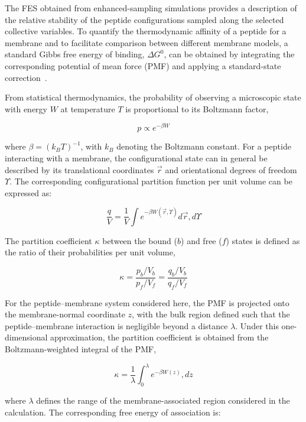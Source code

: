 The FES obtained from enhanced-sampling simulations provides a description of the relative stability of the peptide configurations sampled along the selected collective variables. To quantify the thermodynamic affinity of a peptide for a membrane and to facilitate comparison between different membrane models, a standard Gibbs free energy of binding, $\Delta G^0$, can be obtained by integrating the corresponding potential of mean force (PMF) and applying a standard-state correction~\cite{Woo2005}.

From statistical thermodynamics, the probability of observing a microscopic state with energy $W$ at temperature $T$ is proportional to its Boltzmann factor,

\begin{equation}
p \propto e^{-\beta W}
\end{equation}

where $\beta=(k_B T)^{-1}$, with $k_B$ denoting the Boltzmann constant. For a peptide interacting with a membrane, the configurational state can in general be described by its translational coordinates $\vec{r}$ and orientational degrees of freedom $\Upsilon$. The corresponding configurational partition function per unit volume can be expressed as:

\begin{equation}
\frac{q}{V}
=
\frac{1}{V}
\int
e^{-\beta W(\vec{r},\Upsilon)}
d\vec{r},d\Upsilon
\end{equation}

The partition coefficient $\kappa$ between the bound ($b$) and free ($f$) states is defined as the ratio of their probabilities per unit volume,

\begin{equation}
\kappa
=
\frac{p_b/V_b}{p_f/V_f}
=
\frac{q_b/V_b}{q_f/V_f}
\end{equation}

For the peptide--membrane system considered here, the PMF is projected onto the membrane-normal coordinate $z$, with the bulk region defined such that the peptide--membrane interaction is negligible beyond a distance $\lambda$. Under this one-dimensional approximation, the partition coefficient is obtained from the Boltzmann-weighted integral of the PMF,

\begin{equation}
\kappa
=
\frac{1}{\lambda}
\int_0^\lambda
e^{-\beta W(z)}
,dz
\end{equation}

where $\lambda$ defines the range of the membrane-associated region considered in the calculation. The corresponding free energy of association is:

